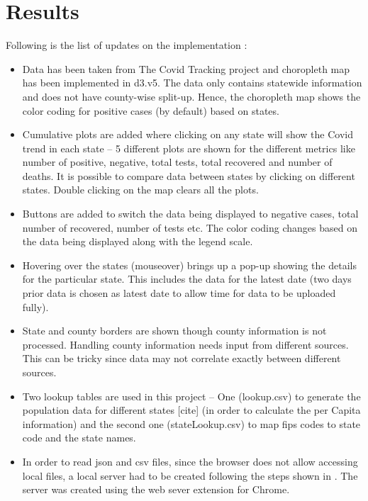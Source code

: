 \section{Results}
\label{sec:conclusion}
\label{sec:results}
Following is the list of updates on the implementation :
\begin{itemize}
\item Data has been taken from The Covid Tracking project and choropleth map has been implemented in d3.v5. The data only contains statewide information and does not have county-wise split-up. Hence, the choropleth map shows the color coding for positive cases (by default) based on states.
\item Cumulative plots are added where clicking on any state will show the Covid trend in each state – 5 different plots are shown for the different metrics like number of positive, negative, total tests, total recovered and number of deaths. It is possible to compare data between states by clicking on different states. Double clicking on the map clears all the plots.
\item Buttons are added to switch the data being displayed to negative cases, total number of recovered, number of tests etc. The color coding changes based on the data being displayed along with the legend scale.
\item Hovering over the states (mouseover) brings up a pop-up showing the details for the particular state. This includes the data for the latest date (two days prior data is chosen as latest date to allow time for data to be uploaded fully).
\item State and county borders are shown though county information is not processed. Handling county information needs input from different sources. This can be tricky since data may not correlate exactly between different sources.
\item Two lookup tables are used in this project – One (lookup.csv) to generate the population data for different states [cite] (in order to calculate the per Capita information) and the second one (stateLookup.csv) to map fips codes to state code and the state names.
\item In order to read json and csv files, since the browser does not allow accessing local files, a local server had to be created following the steps shown in \cite{server}. The server was created using the web sever extension for Chrome. 
\end{itemize}


